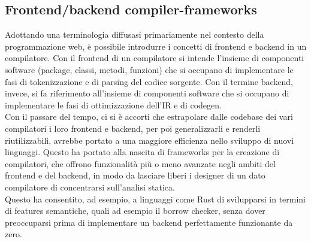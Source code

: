 \subsection{Frontend/backend compiler-frameworks}
Adottando una terminologia diffusasi primariamente nel contesto della programmazione web, 
è possibile introdurre i concetti di frontend e backend in un compilatore. Con il frontend di un 
compilatore si intende l'insieme di componenti software (package, classi, metodi, funzioni) che
si occupano di implementare le fasi di tokenizzazione e di parsing del codice sorgente. Con il termine 
backend, invece, si fa riferimento all'insieme di componenti software che si occupano di implementare
le fasi di ottimizzazione dell'IR e di codegen. \\

Con il passare del tempo, ci si è accorti che estrapolare dalle codebase dei vari compilatori 
i loro frontend e backend, per poi generalizzarli e renderli riutilizzabili, avrebbe portato a
una maggiore efficienza nello sviluppo di nuovi linguaggi. Questo ha portato alla nascita di
frameworks per la creazione di compilatori, che offrono funzionalità più o meno avanzate 
negli ambiti del frontend e del backend, in modo da lasciare liberi i designer di un dato compilatore 
di concentrarsi sull'analisi statica. \\

Questo ha consentito, ad esempio, a linguaggi come Rust di svilupparsi in termini di features semantiche,
quali ad esempio il borrow checker, senza dover preoccuparsi prima di implementare un backend perfettamente
funzionante da zero.


\newpage


\newpage


\newpage


\newpage



\newpage



\newpage